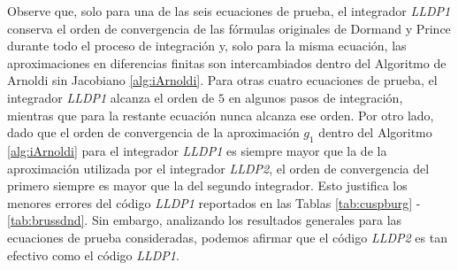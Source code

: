 Observe que, solo para una de las seis ecuaciones de prueba, el integrador \emph{LLDP1} conserva el orden de convergencia de las fórmulas originales de Dormand y Prince durante todo el proceso de integración y, solo para la misma ecuación, las aproximaciones en diferencias finitas son intercambiados dentro del Algoritmo de Arnoldi sin Jacobiano \ref{alg:iArnoldi}. Para otras cuatro ecuaciones de prueba, el integrador \emph{LLDP1} alcanza el orden de $5$ en algunos pasos de integración, mientras que para la restante ecuación nunca alcanza ese orden. Por otro lado, dado que el orden de convergencia de la aproximación $g_1$ dentro del Algoritmo \ref{alg:iArnoldi} para el integrador \emph{LLDP1} es siempre mayor que la de la aproximación utilizada por el integrador \emph{LLDP2}, el orden de convergencia del primero siempre es mayor que la del segundo integrador. Esto justifica los menores errores del código \emph{LLDP1} reportados en las Tablas \ref{tab:cuspburg} - \ref{tab:brussdnd}. Sin embargo, analizando los resultados generales para las ecuaciones de prueba consideradas, podemos afirmar que el código \emph{LLDP2} es tan efectivo como el código \emph{LLDP1}.

